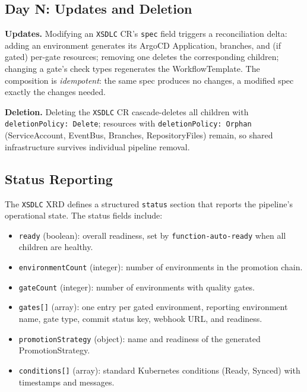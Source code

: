 \subsection{Day N: Updates and Deletion}
\label{subsec:day-n}

\textbf{Updates.} Modifying an \texttt{XSDLC} CR's \texttt{spec} field triggers a reconciliation delta: adding an environment generates its ArgoCD Application, branches, and (if gated) per-gate resources; removing one deletes the corresponding children; changing a gate's check types regenerates the WorkflowTemplate. The composition is \textit{idempotent}: the same spec produces no changes, a modified spec exactly the changes needed.

\textbf{Deletion.} Deleting the \texttt{XSDLC} CR cascade-deletes all children with \texttt{deletionPolicy: Delete}; resources with \texttt{deletionPolicy: Orphan} (ServiceAccount, EventBus, Branches, RepositoryFiles) remain, so shared infrastructure survives individual pipeline removal.

\subsection{Status Reporting}
\label{subsec:status-reporting}

The \texttt{XSDLC} XRD defines a structured \texttt{status} section that reports the pipeline's operational state. The status fields include:

\begin{itemize}
    \item \texttt{ready} (boolean): overall readiness, set by \texttt{function-auto-ready} when all children are healthy.
    \item \texttt{environmentCount} (integer): number of environments in the promotion chain.
    \item \texttt{gateCount} (integer): number of environments with quality gates.
    \item \texttt{gates[]} (array): one entry per gated environment, reporting environment name, gate type, commit status key, webhook URL, and readiness.
    \item \texttt{promotionStrategy} (object): name and readiness of the generated PromotionStrategy.
    \item \texttt{conditions[]} (array): standard Kubernetes conditions (Ready, Synced) with timestamps and messages.
\end{itemize}

